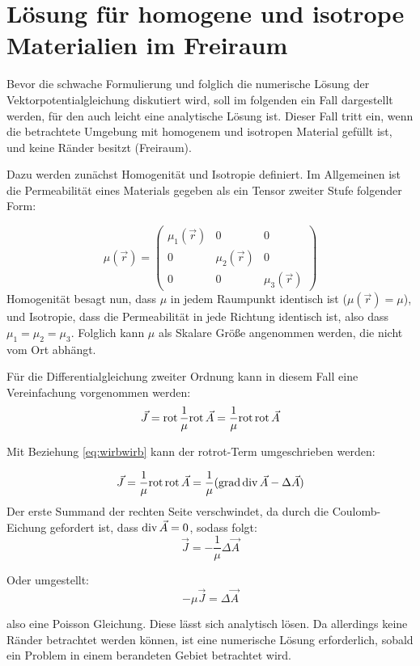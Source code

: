 \section{L\"osung f\"ur homogene und isotrope Materialien im Freiraum}
Bevor die schwache Formulierung und folglich die numerische L\"osung der Vektorpotentialgleichung diskutiert wird, soll im folgenden ein Fall dargestellt werden, f\"ur den auch leicht eine analytische L\"osung ist. Dieser Fall tritt ein, wenn die betrachtete Umgebung mit homogenem und isotropen Material gef\"ullt ist, und keine R\"ander besitzt (Freiraum).
\par
Dazu werden zun\"achst Homogenit\"at und Isotropie definiert. Im Allgemeinen ist die Permeabilit\"at eines Materials gegeben als ein Tensor zweiter Stufe folgender Form:
\par
\begin{equation}
	\mu(\vec{r}) = \begin{pmatrix} \mu_1(\vec{r}) & 0 & 0 \\ 0 &\mu_2(\vec{r})  & 0 \\ 0 & 0 & \mu_3(\vec{r})  \end{pmatrix}
\end{equation}
Homogenit\"at besagt nun, dass $\mu$ in jedem Raumpunkt identisch ist ($\mu(\vec{r}) = \mu$), und Isotropie, dass die Permeabilit\"at in jede Richtung identisch ist, also dass $\mu_1 = \mu_2 = \mu_3$. Folglich kann $\mu$ als Skalare Gr\"o\ss{}e angenommen werden, die nicht vom Ort abh\"angt.
\par
F\"ur die Differentialgleichung zweiter Ordnung kann in diesem Fall eine Vereinfachung vorgenommen werden:
\begin{equation}
	 \vec{J} = \mathrm{rot}\, \frac{1}{\mu} \mathrm{rot}\,\vec{A} = \frac{1}{\mu} \mathrm{rot}\,\mathrm{rot}\,\vec{A}
\end{equation}
\par
Mit Beziehung \ref{eq:wirbwirb} kann der rotrot-Term umgeschrieben werden:
\par
\begin{equation}
	  \vec{J} = \frac{1}{\mu} \mathrm{rot}\,\mathrm{rot}\,\vec{A}  = \frac{1}{\mu} (\mathrm{grad}\,\mathrm{div}\, \vec{A} - \Delta \vec{A})
\end{equation}
Der erste Summand der rechten Seite verschwindet, da durch die Coulomb-Eichung gefordert ist, dass $\mathrm{div}\,\vec{A} = 0$, sodass folgt:
\begin{equation}
	 \vec{J} = -\frac{1}{\mu}\Delta \vec{A}
\end{equation}
\par
Oder umgestellt:
\begin{equation}
	-\mu\vec{J} = \Delta \vec{A}
\end{equation}
\par
also eine Poisson Gleichung. Diese l\"asst sich analytisch l\"osen. Da allerdings keine R\"ander betrachtet werden k\"onnen, ist eine numerische L\"osung erforderlich, sobald ein Problem in einem berandeten Gebiet betrachtet wird.



